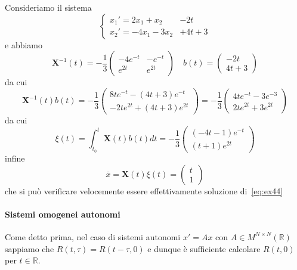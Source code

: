 \begin{example} 
    Consideriamo il sistema
    \begin{equation}\label{eq:ex44}
      \begin{cases}
          x_{1}' = 2x_{1} + x_{2} &- 2t\\
          x_{2}' = -4x_{1} - 3x_{2} &+ 4t + 3
      \end{cases}
    \end{equation}
    e abbiamo
    \[
      \mathbf{X}^{-1} {(t)} = -\frac{1}{3} \begin{pmatrix}
          -4e^{-t} & -e^{-t} \\
          e^{2t} & e^{2t}
      \end{pmatrix}
      \quad 
      b{(t)} = \begin{pmatrix}
          -2t \\
          4t + 3
      \end{pmatrix}
    \]
    da cui
    \[
      \mathbf{X}^{-1}{(t)} b{(t)} = -\frac{1}{3} \begin{pmatrix}
          8te^{-t}-{(4t+3)}e^{-t} \\
          -2te^{2t} + {(4t+3)}e^{2t}
      \end{pmatrix}
      = -\frac{1}{3}
      \begin{pmatrix}
          4te^{-t}-3e^{-3}  \\
          2te^{2t}+3e^{2t}
      \end{pmatrix}
    \]
    da cui
    \[
        \xi {(t)} = \int_{t_{0}}^{t} \mathbf{X} {(t)} b{(t)} dt = -\frac{1}{3}
        \begin{pmatrix}
            {(-4t-1)}e^{-t} \\
            {(t+1)}e^{2t}
        \end{pmatrix}
    \]
    infine
    \[
      \overline{x} = \mathbf{X} {(t)}\xi {(t)} = \begin{pmatrix}
          t \\
          1
      \end{pmatrix}
    \] che si può verificare velocemente essere effettivamente soluzione
    di~\eqref{eq:ex44}
    
\end{example}

\paragraph{ Sistemi omogenei autonomi } Come detto prima, nel caso di sistemi
autonomi \(x' = Ax\) con \(A \in M^{N \times N}{(\mathbb{R})}\) sappiamo che
\(R{(t, \tau)} = R{(t-\tau, 0)}\) e dunque è sufficiente calcolare \(R{(t, 0)}\)
per \(t \in \mathbb{R}\).

